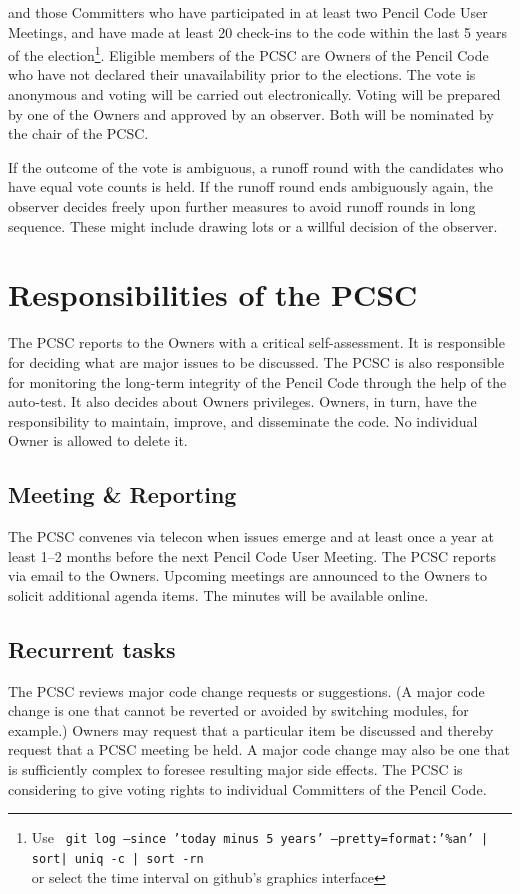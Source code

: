 \documentclass{article}
\begin{document}
and those Committers who have participated in at least two
{\sc Pencil Code} User Meetings, and have made at least 20 check-ins to
the code within the last 5 years of the election\footnote{Use {\tt
git log --since 'today minus 5 years' --pretty=format:'\%an' | sort| uniq -c | sort -rn} \\
or select the time interval on github's graphics interface}.
Eligible members of the PCSC are Owners of the {\sc Pencil Code}
who have not declared their unavailability prior to the elections.
The vote is anonymous and voting will be carried out electronically.
Voting will be prepared by one of the Owners and approved by an observer.
Both will be nominated by the chair of the PCSC.

If the outcome of the vote is ambiguous, a runoff round with the candidates who have
equal vote counts is held.
If the runoff round ends ambiguously again, the observer decides freely
upon further measures to avoid runoff rounds in long sequence.
These might include drawing lots or a willful decision of the observer.

\section{Responsibilities of the PCSC}
The PCSC reports to the Owners with a critical self-assessment.
It is responsible for deciding what are major issues to be discussed.
The PCSC is also responsible for monitoring the long-term integrity
of the {\sc Pencil Code} through the help of the auto-test.
It also decides about Owners privileges.
Owners, in turn, have the responsibility to maintain, improve,
and disseminate the code.
No individual Owner is allowed to delete it.

\subsection{Meeting \& Reporting}

The PCSC convenes via telecon when issues emerge and
at least once a year at least 1--2 months before the next
Pencil Code User Meeting.
The PCSC reports via email to the Owners.
Upcoming meetings are announced to the Owners
to solicit additional agenda items.
The minutes will be available online.

\subsection{Recurrent tasks}

The PCSC reviews major code change requests or suggestions.
(A major code change is one that cannot be reverted or avoided
by switching modules, for example.)
Owners may request that a particular item be discussed and thereby
request that a PCSC meeting be held.
A major code change may also be one that is sufficiently complex
to foresee resulting major side effects.
The PCSC is considering to give voting rights to individual Committers
of the {\sc Pencil Code}.
\end{document}
